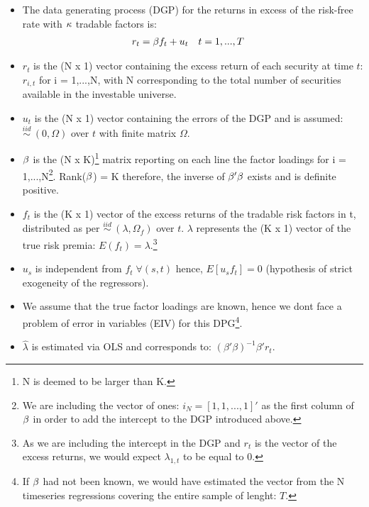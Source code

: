 \documentclass[]{article}
\begin{document}
\begin{itemize}
	\item The data generating process (DGP) for the returns in excess of the risk-free rate with $\MakeUppercase\kappa$ tradable factors is: 
	\begin{align} \label{cross-sectional}
		r_{t} &= \MakeUppercase\beta f_t + u_t \quad t = 1,...,T 
	\end{align} \vspace{-1.75em} 
	\item $r_t$ is the (N x 1) vector containing the excess return of each security at time $t$: $r_{i,t}$ for i = 1,...,N, with N corresponding to the total number of securities available in the investable universe.   
	\item $u_t$ is the (N x 1) vector containing the errors of the DGP and is assumed: $\overset{iid}{\sim} \: (0,\Omega)$ over $t$ with finite matrix $\Omega$. 
	\item $\MakeUppercase\beta$ is the (N x K)\footnote{N is deemed to be larger than K.} matrix reporting on each line the factor loadings for i = 1,...,N\footnote{We are including the vector of ones: $i_N = [1,1,...,1]'$ as the first column of $\MakeUppercase\beta$ in order to add the intercept to the DGP introduced above.}.
	\subitem Rank($\MakeUppercase\beta$) = K therefore, the inverse of $\MakeUppercase\beta'\MakeUppercase\beta$ exists and is definite positive. 
	\item $f_t$ is the (K x 1) vector of the excess returns of the tradable risk factors in t, distributed as per $\overset{iid}{\sim} \: (\lambda,\Omega_{f})$ over $t$. $\lambda$ represents the (K x 1) vector of the true risk premia: $E(f_t) = \lambda$.\footnote{As we are including the intercept in the DGP and $r_{t}$ is the vector of the excess returns, we would expect $\lambda_{1,t}$ to be equal to 0.}
	\item $u_s$ is independent from $f_t \; \forall(s,t)$ hence, $E[u_{s}f_t] = 0$ (hypothesis of strict exogeneity of the regressors).
	\item We assume that the true factor loadings are known, hence we dont face a problem of error in variables (EIV) for this DPG\footnote{If $\MakeUppercase\beta$ had not been known, we would have estimated the vector from the N timeseries regressions covering the entire sample of lenght: $T$.}.
	\item $\hat{\lambda}$ is estimated via OLS and corresponds to: $(\beta'\beta)^{-1}\beta'r_t$.
\end{itemize}
\end{document}

